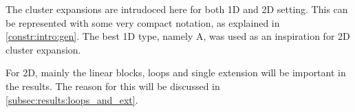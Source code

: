 The cluster expansions are intrudoced here for both 1D and 2D setting. This can be represented with some very compact notation, as explained in \cref{constr:intro:gen}. The best 1D type, namely A, was used as an inspiration for 2D cluster expansion.

For 2D, mainly the linear blocks, loops and single extension will be important in the results. The reason for this will be discussed in \cref{subsec:results:loops_and_ext}.